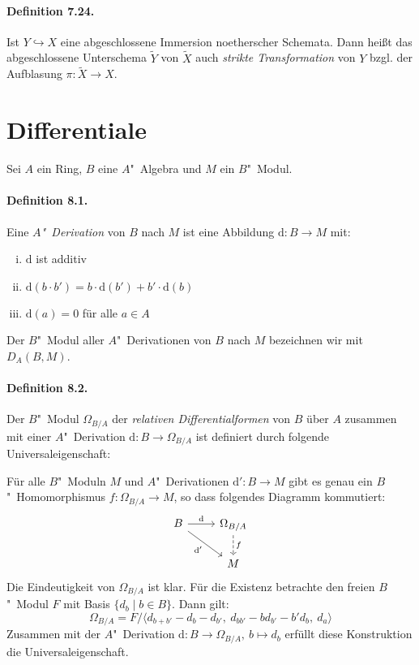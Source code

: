 \documentclass[11pt,b5paper,openany]{memoir}
\begin{document}
\paragraph{Definition 7.24.}\label{7.24} Ist $Y\hookrightarrow X$ eine abgeschlossene Immersion noetherscher Schemata. Dann heißt das abgeschlossene Unterschema $\widetilde{Y}$ von $\widetilde{X}$ auch \textit{strikte Transformation} von $Y$ bzgl. der Aufblasung $\pi:\widetilde{X}\to X$.

\section{Differentiale}

Sei $A$ ein Ring, $B$ eine $A$"~Algebra und $M$ ein $B$"~Modul.

\paragraph{Definition 8.1.}\label{8.1} Eine \textit{$A$"~Derivation} von $B$ nach $M$ ist eine Abbildung $\mathrm{d}:B\to M$ mit:
\begin{enumerate}[(i)]
\item $\mathrm{d}$ ist additiv
\item $\mathrm{d}(b\cdot b')=b\cdot \mathrm{d}(b')+ b'\cdot \mathrm{d}(b)$
\item $\mathrm{d}(a)=0$ für alle $a\in A$
\end{enumerate}
Der $B$"~Modul aller $A$"~Derivationen von $B$ nach $M$ bezeichnen wir mit $D_A(B,M)$.

\paragraph{Definition 8.2.}\label{8.2} Der $B$"~Modul $\Omega_{B/A}$ der \textit{relativen Differentialformen} von $B$ über $A$ zusammen mit einer $A$"~Derivation $\mathrm{d}:B\to\Omega_{B/A}$ ist definiert durch folgende Universaleigenschaft:

Für alle $B$"~Moduln $M$ und $A$"~Derivationen $\mathrm{d}':B\to M$ gibt es genau ein $B$"~Ho\-mo\-mor\-phis\-mus $f:\Omega_{B/A}\to M$, so dass folgendes Diagramm kommutiert:
\[\begin{tikzcd}
B\ar[r, "\mathrm{d}"]\ar[rd, "\mathrm{d}'"'] & \Omega_{B/A}\ar[d, "f", dashed]\\
& M
\end{tikzcd}\]
Die Eindeutigkeit von $\Omega_{B/A}$ ist klar. Für die Existenz betrachte den freien $B$"~Modul $F$ mit Basis $\{d_b\mid b\in B\}$. Dann gilt:
\[\Omega_{B/A}=F / \langle d_{b+b'}-d_b-d_{b'},\ d_{bb'}-bd_{b'}-b'd_b,\ d_a\rangle \]
Zusammen mit der $A$"~Derivation $\mathrm{d}:B\to\Omega_{B/A},\ b\mapsto d_b$ erfüllt diese Konstruktion die Universaleigenschaft.
\end{document}
